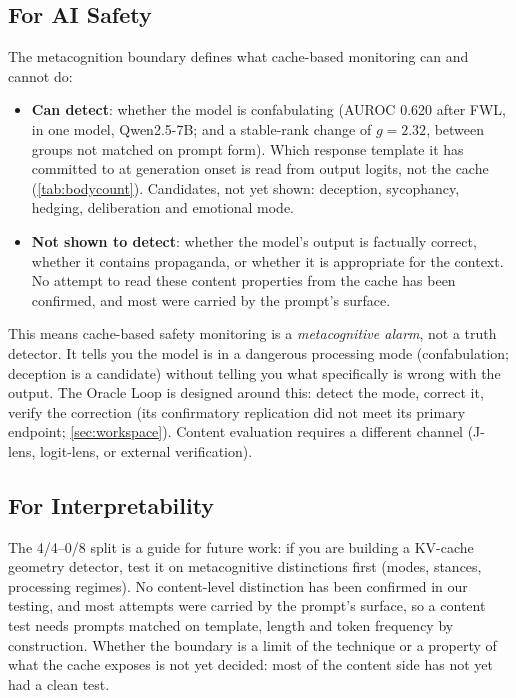 \documentclass[11pt,a4paper]{article}
\begin{document}
\subsection{For AI Safety}

The metacognition boundary defines what cache-based monitoring can and
cannot do:

\begin{itemize}[nosep]
\item \textbf{Can detect}: whether the model is confabulating (AUROC
  0.620 after FWL, in one model, Qwen2.5-7B; and a stable-rank change
  of $g{=}2.32$, between groups not matched on prompt form). Which
  response template it has committed to at generation onset is read
  from output logits, not the cache (\cref{tab:bodycount}). Candidates, not yet
  shown: deception, sycophancy, hedging, deliberation and emotional
  mode.
\item \textbf{Not shown to detect}: whether the model's output is
  factually correct, whether it contains propaganda, or whether it is
  appropriate for the context. No attempt to read these content
  properties from the cache has been confirmed, and most were carried
  by the prompt's surface.
\end{itemize}

This means cache-based safety monitoring is a \emph{metacognitive
alarm}, not a truth detector. It tells you the model is in a dangerous
processing mode (confabulation; deception is a candidate) without
telling you what specifically is wrong with the output. The Oracle Loop
is designed around this: detect the mode, correct it, verify the
correction (its confirmatory replication did not meet its primary
endpoint; \cref{sec:workspace}).
Content evaluation requires a different channel (J-lens, logit-lens,
or external verification).

\subsection{For Interpretability}

The 4/4--0/8 split is a guide for future work: if you are building a
KV-cache geometry detector, test it on metacognitive distinctions
first (modes, stances, processing regimes). No content-level
distinction has been confirmed in our testing, and most attempts were
carried by the prompt's surface, so a content test needs prompts
matched on template, length and token frequency by construction.
Whether the boundary is a limit of the technique or a property of what
the cache exposes is not yet decided: most of the content side has not
yet had a clean test.
\end{document}
